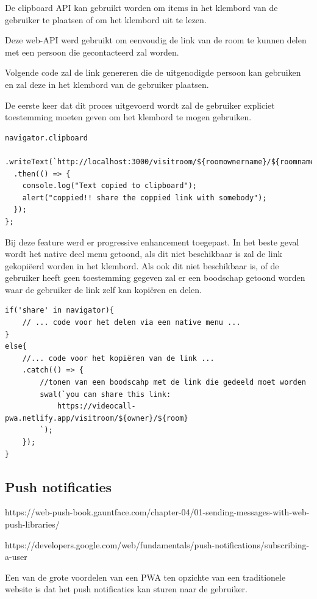 		De clipboard API kan gebruikt worden om items in het klembord van de gebruiker te plaatsen of om het klembord uit te lezen.
		
		Deze web-API werd gebruikt om eenvoudig de link van de room te kunnen delen met een persoon die gecontacteerd zal worden.
		
		Volgende code zal de link genereren die de uitgenodigde persoon kan gebruiken en zal deze in het klembord van de gebruiker plaatsen.
		
		De eerste keer dat dit proces uitgevoerd wordt zal de gebruiker expliciet toestemming moeten geven om het klembord te mogen gebruiken.

\begin{lstlisting}
navigator.clipboard
  .writeText(`http://localhost:3000/visitroom/${roomownername}/${roomname}`)
  .then(() => {
    console.log("Text copied to clipboard");
    alert("coppied!! share the coppied link with somebody");
  });
};
\end{lstlisting}

		Bij deze feature werd er progressive enhancement toegepast. 
		In het beste geval wordt het native deel menu getoond, als dit niet beschikbaar is zal de link gekopiëerd worden in het klembord.
		Als ook dit niet beschikbaar is, of de gebruiker heeft geen toestemming gegeven zal er een boodschap getoond worden waar de gebruiker de link zelf kan kopiëren en delen.
		
\begin{lstlisting}
if('share' in navigator){
	// ... code voor het delen via een native menu ...
}
else{
	//... code voor het kopiëren van de link ...
	.catch(() => {
		//tonen van een boodscahp met de link die gedeeld moet worden
		swal(`you can share this link:
			https://videocall-pwa.netlify.app/visitroom/${owner}/${room}
		`);
	});
}
\end{lstlisting}


	\subsection{Push notificaties}
	
	https://web-push-book.gauntface.com/chapter-04/01-sending-messages-with-web-push-libraries/
	
	https://developers.google.com/web/fundamentals/push-notifications/subscribing-a-user
	
		Een van de grote voordelen van een PWA ten opzichte van een traditionele website is dat het push notificaties kan sturen naar de gebruiker.
		
